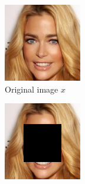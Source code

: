 \begin{figure}
    \captionsetup[subfigure]{labelformat=empty}
    \begin{subfigure}{.135\textwidth}
        \includegraphics[width=\textwidth]{Chapter2/samples/diversity/x.png}
        \caption{\scriptsize Original image $x$}
    \end{subfigure}
    \begin{subfigure}{.135\textwidth}
        \includegraphics[width=\textwidth]{Chapter2/samples/diversity/y.png}

\end{subfigure}
\end{figure}
